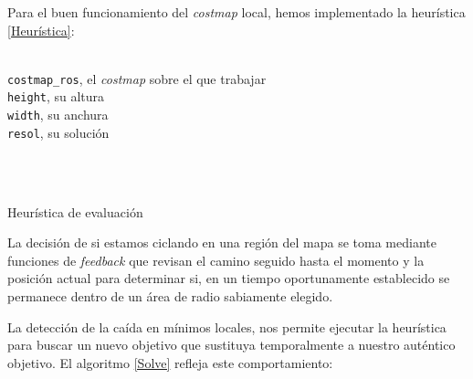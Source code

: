\documentclass[a4paper, 11pt]{article}
\begin{document}
	Para el buen funcionamiento del \textit{costmap} local, hemos implementado la heurística \ref{Heurística}:
	
	\begin{algorithm}[H]
		\begin{algorithmic}[1]

			\REQUIRE \ \\
	        	\texttt{costmap\_ros}, el \textit{costmap} sobre el que trabajar\\
	        	\texttt{height}, su altura\\
	        	\texttt{width}, su anchura\\
	        	\texttt{resol}, su solución\\ \

	     	\\
				\ENDIF
			\ENDFOR
				  		
		\end{algorithmic}
		\caption{Heurística de evaluación}
		\label{Heurística}
	\end{algorithm}

	La decisión de si estamos ciclando en una región del mapa se toma mediante funciones de \textit{feedback}
	que revisan el camino seguido hasta el momento y la posición actual para determinar si, en un tiempo
	oportunamente establecido se permanece dentro de un área de radio sabiamente elegido.
	
	La detección de la caída en mínimos locales, nos permite ejecutar la heurística para buscar un nuevo
	objetivo que sustituya temporalmente a nuestro auténtico objetivo. El algoritmo \ref{Solve} refleja
	este comportamiento:
	
\end{document}
